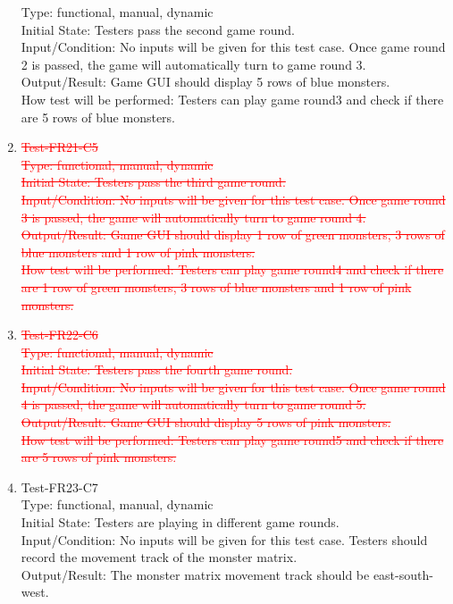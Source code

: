 \documentclass[12pt]{article}
\begin{document}
\begin{enumerate}[1.]
{{Type: functional, manual, dynamic\\
Initial State: Testers pass the second game round.\\
Input/Condition: No inputs will be given for this test 
case. Once game round 2 is passed, the game will
automatically turn to game round 3.\\
Output/Result: Game GUI should display 5 rows of blue monsters.\\
How test will be performed: Testers can play game round3
and check if there are 5
rows of blue monsters.}}
\item \textcolor{red}{\st{Test-FR21-C5\\
Type: functional, manual, dynamic\\
Initial State: Testers pass the third game round.\\
Input/Condition: No inputs will be given for this test 
case. Once game round 3 is passed, the game will
automatically turn to game round 4.\\
Output/Result: Game GUI should display 1 row of green monsters, 3 rows of blue monsters and 1 row
 of pink monsters.\\
How test will be performed: Testers can play game round4
and check if there are 1 row of green monsters, 3 rows of blue monsters and 1 row of pink monsters.}}
\item \textcolor{red}{\st{Test-FR22-C6\\
Type: functional, manual, dynamic\\
Initial State: Testers pass the fourth game round.\\
Input/Condition: No inputs will be given for this test 
case. Once game round 4 is passed, the game will
automatically turn to game round 5.\\
Output/Result: Game GUI should display 5 rows
of pink monsters.\\
How test will be performed: Testers can play game round5
and check if there are 5
rows of pink monsters.}}
\newpage
\item Test-FR23-C7\\
Type: functional, manual, dynamic\\
Initial State: Testers are playing in different game
rounds.\\
Input/Condition: No inputs will be given for this 
test case. Testers should record the movement track of
the monster matrix.\\
Output/Result: The monster matrix movement track should
be east-south-west.\\

\end{enumerate}
\end{document}
